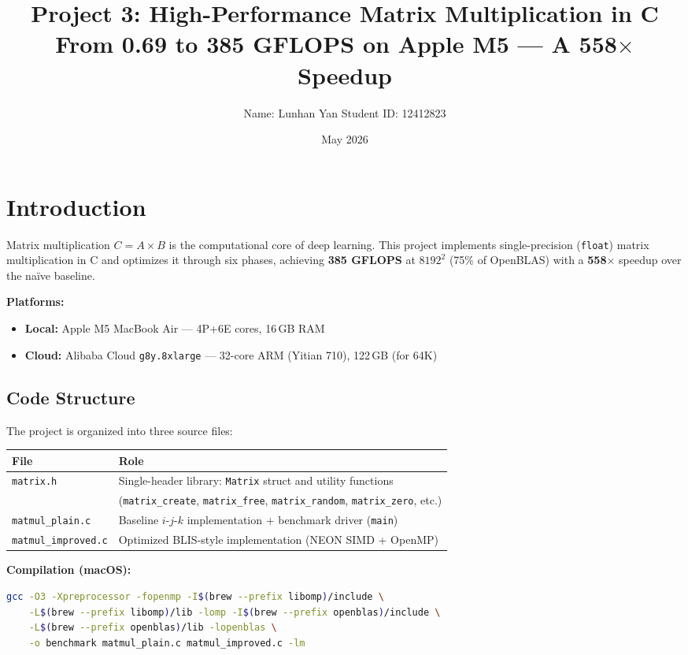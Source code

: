 \documentclass[11pt,a4paper]{article}
\title{\textbf{Project 3: High-Performance Matrix Multiplication in C}\\[0.4em]
\large From 0.69 to 385 GFLOPS on Apple M5 --- A 558$\times$ Speedup}
\author{Name: Lunhan Yan \quad Student ID: 12412823}
\date{May 2026}
\begin{document}
\maketitle

\section{Introduction}

Matrix multiplication $C=A\times B$ is the computational core of deep learning.
This project implements single-precision (\texttt{float}) matrix multiplication in C
and optimizes it through six phases, achieving \textbf{385 GFLOPS} at $8192^2$
(75\% of OpenBLAS) with a \textbf{558$\times$} speedup over the na\"ive baseline.

\textbf{Platforms:}
\begin{itemize}[nosep]
  \item \textbf{Local:} Apple M5 MacBook Air --- 4P+6E cores, 16\,GB RAM
  \item \textbf{Cloud:} Alibaba Cloud \texttt{g8y.8xlarge} --- 32-core ARM (Yitian 710), 122\,GB (for 64K)
\end{itemize}

\subsection*{Code Structure}

The project is organized into three source files:

\begin{table}[H]\centering
\begin{tabular}{l|l}
\toprule
\textbf{File} & \textbf{Role} \\
\midrule
\texttt{matrix.h} & Single-header library: \texttt{Matrix} struct and utility functions \\
                   & (\texttt{matrix\_create}, \texttt{matrix\_free}, \texttt{matrix\_random}, \texttt{matrix\_zero}, etc.) \\
\texttt{matmul\_plain.c} & Baseline $i$-$j$-$k$ implementation + benchmark driver (\texttt{main}) \\
\texttt{matmul\_improved.c} & Optimized BLIS-style implementation (NEON SIMD + OpenMP) \\
\bottomrule
\end{tabular}
\end{table}

\noindent\textbf{Compilation (macOS):}
\begin{lstlisting}[language=bash,numbers=none,basicstyle=\ttfamily\scriptsize]
gcc -O3 -Xpreprocessor -fopenmp -I$(brew --prefix libomp)/include \
    -L$(brew --prefix libomp)/lib -lomp -I$(brew --prefix openblas)/include \
    -L$(brew --prefix openblas)/lib -lopenblas \
    -o benchmark matmul_plain.c matmul_improved.c -lm
\end{lstlisting}
\end{document}

